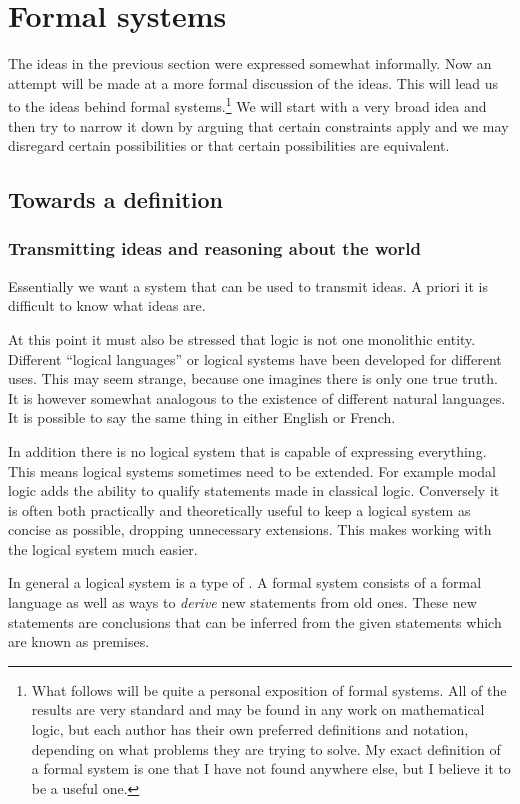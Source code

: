 \chapter{Formal systems}
The ideas in the previous section were expressed somewhat informally. Now an attempt will be made at a more formal discussion of the ideas. This will lead us to the ideas behind formal systems.\footnote{What follows will be quite a personal exposition of formal systems. All of the results are very standard and may be found in any work on mathematical logic, but each author has their own preferred definitions and notation, depending on what problems they are trying to solve. My exact definition of a formal system is one that I have not found anywhere else, but I believe it to be a useful one.} We will start with a very broad idea and then try to narrow it down by arguing that certain constraints apply and we may disregard certain possibilities or that certain possibilities are equivalent.

\section{Towards a definition}
\subsection{Transmitting ideas and reasoning about the world}
Essentially we want a system that can be used to transmit ideas. A priori it is difficult to know what ideas are. 


At this point it must also be stressed that logic is not one monolithic entity. Different ``logical languages'' or logical systems have been developed for different uses. This may seem strange, because one imagines there is only one true truth. It is however somewhat analogous to the existence of different natural languages. It is possible to say the same thing in either English or French.

In addition there is no logical system that is capable of expressing everything. This means logical systems sometimes need to be extended. For example modal logic adds the ability to qualify statements made in classical logic. Conversely it is often both practically and theoretically useful to keep a logical system as concise as possible, dropping unnecessary extensions. This makes working with the logical system much easier.

In general a logical system is a type of . A formal system consists of a formal language as well as ways to \textit{derive} new statements from old ones. These new statements are conclusions that can be inferred from the given statements which are known as premises.

